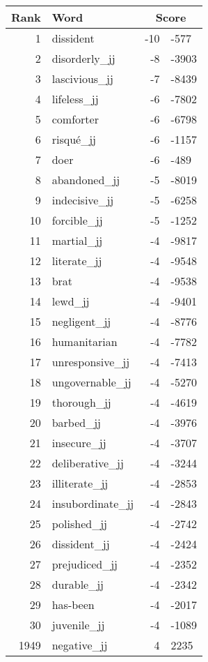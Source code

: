\begin{longtable}[!htbp]{| rlr@{.}l |}
    \hline
    \textbf{Rank} & \textbf{Word} & \multicolumn{2}{c|}{\textbf{Score}} \\
    \hline
    \endhead
    1 & dissident & -10 & -577 \\
    2 & disorderly\_jj & -8 & -3903 \\
    3 & lascivious\_jj & -7 & -8439 \\
    4 & lifeless\_jj & -6 & -7802 \\
    5 & comforter & -6 & -6798 \\
    6 & risqué\_jj & -6 & -1157 \\
    7 & doer & -6 & -489 \\
    8 & abandoned\_jj & -5 & -8019 \\
    9 & indecisive\_jj & -5 & -6258 \\
    10 & forcible\_jj & -5 & -1252 \\
    11 & martial\_jj & -4 & -9817 \\
    12 & literate\_jj & -4 & -9548 \\
    13 & brat & -4 & -9538 \\
    14 & lewd\_jj & -4 & -9401 \\
    15 & negligent\_jj & -4 & -8776 \\
    16 & humanitarian & -4 & -7782 \\
    17 & unresponsive\_jj & -4 & -7413 \\
    18 & ungovernable\_jj & -4 & -5270 \\
    19 & thorough\_jj & -4 & -4619 \\
    20 & barbed\_jj & -4 & -3976 \\
    21 & insecure\_jj & -4 & -3707 \\
    22 & deliberative\_jj & -4 & -3244 \\
    23 & illiterate\_jj & -4 & -2853 \\
    24 & insubordinate\_jj & -4 & -2843 \\
    25 & polished\_jj & -4 & -2742 \\
    26 & dissident\_jj & -4 & -2424 \\
    27 & prejudiced\_jj & -4 & -2352 \\
    28 & durable\_jj & -4 & -2342 \\
    29 & has-been & -4 & -2017 \\
    30 & juvenile\_jj & -4 & -1089 \\
    1949 & negative\_jj & 4 & 2235 \\

\end{longtable}
